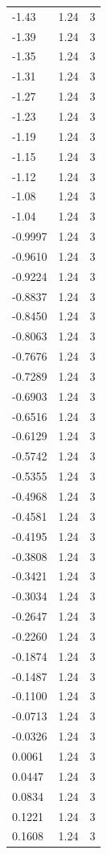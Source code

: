 \begin{longtable}{lrr}
  -1.43 & 1.24 & 3 \\
  -1.39 & 1.24 & 3 \\
  -1.35 & 1.24 & 3 \\
  -1.31 & 1.24 & 3 \\
  -1.27 & 1.24 & 3 \\
  -1.23 & 1.24 & 3 \\
  -1.19 & 1.24 & 3 \\
  -1.15 & 1.24 & 3 \\
  -1.12 & 1.24 & 3 \\
  -1.08 & 1.24 & 3 \\
  -1.04 & 1.24 & 3 \\
  -0.9997 & 1.24 & 3 \\
  -0.9610 & 1.24 & 3 \\
  -0.9224 & 1.24 & 3 \\
  -0.8837 & 1.24 & 3 \\
  -0.8450 & 1.24 & 3 \\
  -0.8063 & 1.24 & 3 \\
  -0.7676 & 1.24 & 3 \\
  -0.7289 & 1.24 & 3 \\
  -0.6903 & 1.24 & 3 \\
  -0.6516 & 1.24 & 3 \\
  -0.6129 & 1.24 & 3 \\
  -0.5742 & 1.24 & 3 \\
  -0.5355 & 1.24 & 3 \\
  -0.4968 & 1.24 & 3 \\
  -0.4581 & 1.24 & 3 \\
  -0.4195 & 1.24 & 3 \\
  -0.3808 & 1.24 & 3 \\
  -0.3421 & 1.24 & 3 \\
  -0.3034 & 1.24 & 3 \\
  -0.2647 & 1.24 & 3 \\
  -0.2260 & 1.24 & 3 \\
  -0.1874 & 1.24 & 3 \\
  -0.1487 & 1.24 & 3 \\
  -0.1100 & 1.24 & 3 \\
  -0.0713 & 1.24 & 3 \\
  -0.0326 & 1.24 & 3 \\
  0.0061 & 1.24 & 3 \\
  0.0447 & 1.24 & 3 \\
  0.0834 & 1.24 & 3 \\
  0.1221 & 1.24 & 3 \\
  0.1608 & 1.24 & 3 \\

\end{longtable}
